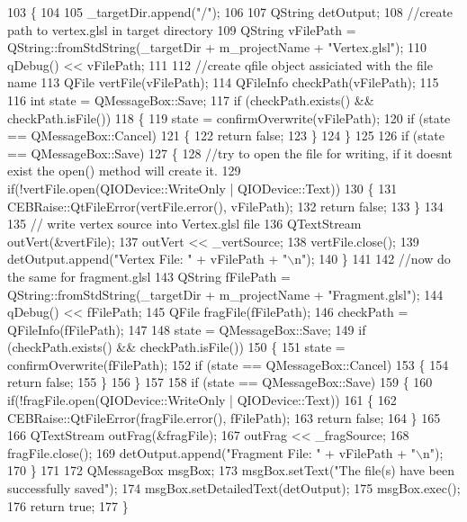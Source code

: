 \begin{DoxyCode}
103 \{
104 
105   \_targetDir.append(\textcolor{stringliteral}{"/"});
106 
107   QString detOutput;
108   \textcolor{comment}{//create path to vertex.glsl in target directory}
109   QString vFilePath = QString::fromStdString(\_targetDir + m_projectName + \textcolor{stringliteral}{"Vertex.glsl"});
110   qDebug() << vFilePath;
111 
112   \textcolor{comment}{//create qfile object assiciated with the file name}
113   QFile vertFile(vFilePath);
114   QFileInfo checkPath(vFilePath);
115 
116   \textcolor{keywordtype}{int} state = QMessageBox::Save;
117   \textcolor{keywordflow}{if} (checkPath.exists() && checkPath.isFile())
118   \{
119     state = confirmOverwrite(vFilePath);
120     \textcolor{keywordflow}{if} (state == QMessageBox::Cancel)
121     \{
122       \textcolor{keywordflow}{return} \textcolor{keyword}{false};
123     \}
124   \}
125 
126   \textcolor{keywordflow}{if} (state == QMessageBox::Save)
127   \{
128     \textcolor{comment}{//try to open the file for writing, if it doesnt exist the open() method will create it.}
129     \textcolor{keywordflow}{if}(!vertFile.open(QIODevice::WriteOnly | QIODevice::Text))
130     \{
131       CEBRaise::QtFileError(vertFile.error(), vFilePath);
132       \textcolor{keywordflow}{return} \textcolor{keyword}{false};
133     \}
134 
135     \textcolor{comment}{// write vertex source into Vertex.glsl file}
136     QTextStream outVert(&vertFile);
137     outVert << \_vertSource;
138     vertFile.close();
139     detOutput.append(\textcolor{stringliteral}{"Vertex File: "} + vFilePath + \textcolor{stringliteral}{"\(\backslash\)n"});
140   \}
141 
142   \textcolor{comment}{//now do the same for fragment.glsl}
143   QString fFilePath = QString::fromStdString(\_targetDir + m_projectName + \textcolor{stringliteral}{"Fragment.glsl"});
144   qDebug() << fFilePath;
145   QFile fragFile(fFilePath);
146   checkPath = QFileInfo(fFilePath);
147 
148   state = QMessageBox::Save;
149   \textcolor{keywordflow}{if} (checkPath.exists() && checkPath.isFile())
150   \{
151     state = confirmOverwrite(fFilePath);
152     \textcolor{keywordflow}{if} (state == QMessageBox::Cancel)
153     \{
154       \textcolor{keywordflow}{return} \textcolor{keyword}{false};
155     \}
156   \}
157 
158   \textcolor{keywordflow}{if} (state == QMessageBox::Save)
159   \{
160     \textcolor{keywordflow}{if}(!fragFile.open(QIODevice::WriteOnly | QIODevice::Text))
161     \{
162       CEBRaise::QtFileError(fragFile.error(), fFilePath);
163       \textcolor{keywordflow}{return} \textcolor{keyword}{false};
164     \}
165 
166     QTextStream outFrag(&fragFile);
167     outFrag << \_fragSource;
168     fragFile.close();
169     detOutput.append(\textcolor{stringliteral}{"Fragment File: "} + vFilePath + \textcolor{stringliteral}{"\(\backslash\)n"});
170   \}
171 
172   QMessageBox msgBox;
173   msgBox.setText(\textcolor{stringliteral}{"The file(s) have been successfully saved"});
174   msgBox.setDetailedText(detOutput);
175   msgBox.exec();
176   \textcolor{keywordflow}{return} \textcolor{keyword}{true};
177 \}
\end{DoxyCode}


